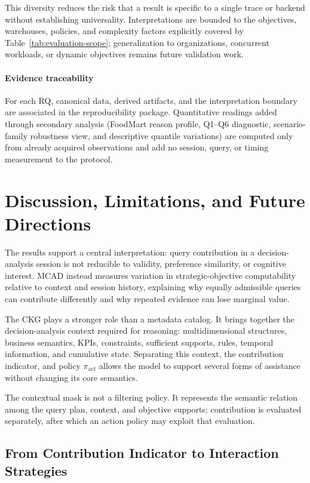 \documentclass[journal]{IEEEtran}
\begin{document}
This diversity reduces the risk that a result is specific to a single trace or backend without establishing universality. Interpretations are bounded to the objectives, warehouses, policies, and complexity factors explicitly covered by Table~\ref{tab:evaluation-scope}; generalization to organizations, concurrent workloads, or dynamic objectives remains future validation work.

\paragraph*{Evidence traceability} For each RQ, canonical data, derived artifacts, and the interpretation boundary are associated in the reproducibility package. Quantitative readings added through secondary analysis (FoodMart reason profile, Q1--Q6 diagnostic, scenario-family robustness view, and descriptive quantile variations) are computed only from already acquired observations and add no session, query, or timing measurement to the protocol.

\section{Discussion, Limitations, and Future Directions}
\label{sec:discussion}

The results support a central interpretation: query contribution in a decision-analysis session is not reducible to validity, preference similarity, or cognitive interest. MCAD instead measures variation in strategic-objective computability relative to context and session history, explaining why equally admissible queries can contribute differently and why repeated evidence can lose marginal value.

The CKG plays a stronger role than a metadata catalog. It brings together the decision-analysis context required for reasoning: multidimensional structures, business semantics, KPIs, constraints, sufficient supports, rules, temporal information, and cumulative state. Separating this context, the contribution indicator, and policy $\pi_{\mathrm{act}}$ allows the model to support several forms of assistance without changing its core semantics.

The contextual mask is not a filtering policy. It represents the semantic relation among the query plan, context, and objective supports; contribution is evaluated separately, after which an action policy may exploit that evaluation.

\subsection{From Contribution Indicator to Interaction Strategies}
\end{document}
